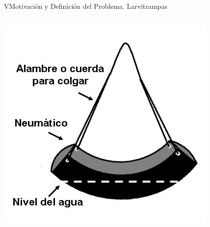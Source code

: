 \begin{frame}[t]{VMotivación y Definición del Problema. Larvitrampas}
  \begin{center}
    \begin{columns}[c]
        \begin{column}[c]{3cm}
          \includegraphics[width=\textwidth]{../book/anexos/graphics/disenho-1.png}


\end{column}
\end{columns}
\end{center}
\end{frame}
